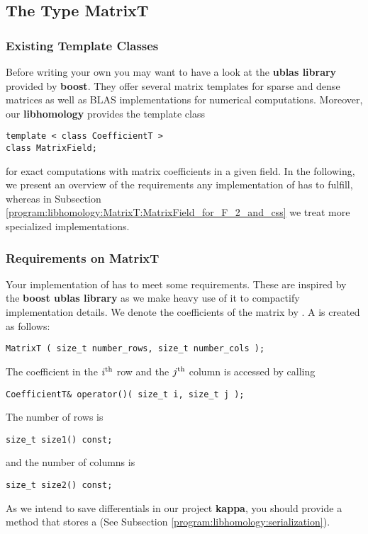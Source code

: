 \subsection{The Type MatrixT}
\label{program:libhomology:MatrixT}
\subsubsection{Existing Template Classes}
Before writing your own  you may want to have a look at the {\bf ublas library} provided by {\bf boost}.
They offer several matrix templates for sparse and dense matrices 
as well as BLAS implementations for numerical computations.
Moreover, our {\bf libhomology} provides the template class
\begin{lstlisting}
template < class CoefficientT >
class MatrixField;
\end{lstlisting}
for exact computations with matrix coefficients in a given field.
In the following, we present an overview of the requirements any implementation of  has to fulfill, whereas
in Subsection \ref{program:libhomology:MatrixT:MatrixField_for_F_2_and_css} we treat more specialized implementations.

\subsubsection{Requirements on MatrixT}
Your implementation of  has to meet some requirements.
These are inspired by the {\bf boost ublas library} as we make heavy use of it to compactify implementation details.
We denote the coefficients of the matrix by .
A  is created as follows:
\begin{lstlisting}
MatrixT ( size_t number_rows, size_t number_cols );
\end{lstlisting}
The coefficient in the $i^{\text{th}}$ row and the $j^{\text{th}}$ column is accessed by calling
\begin{lstlisting}
CoefficientT& operator()( size_t i, size_t j );
\end{lstlisting}
The number of rows is 
\begin{lstlisting}
size_t size1() const;
\end{lstlisting}
and the number of columns is
\begin{lstlisting}
size_t size2() const;
\end{lstlisting}

As we intend to save differentials in our project {\bf kappa}, you should provide a method that stores a  (See Subsection \ref{program:libhomology:serialization}).

